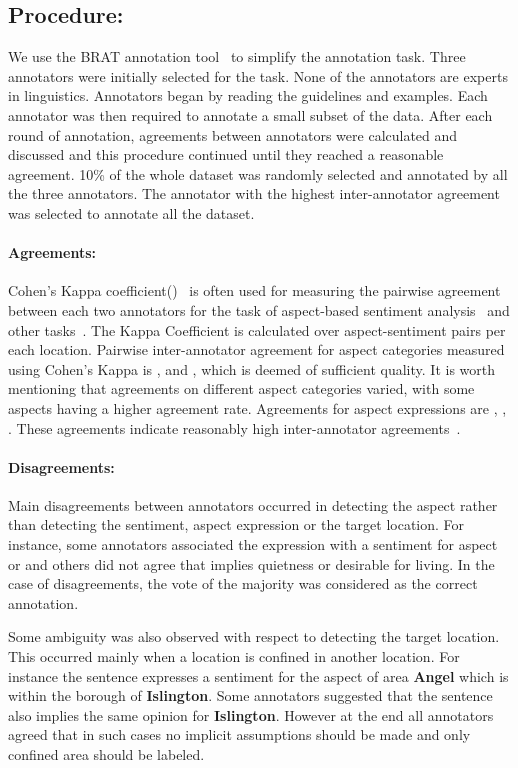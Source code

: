 \documentclass[11pt]{article}
\begin{document}
    \subsection{Procedure:} 
     We use the BRAT annotation tool~\cite{stenetorp2012brat} to simplify the annotation task. Three annotators were initially selected for the task. None of the annotators are experts in linguistics. Annotators began by reading the guidelines and examples. Each annotator was then required to annotate a small subset of the data. After each round of annotation, agreements between annotators were calculated and discussed and this procedure continued until they reached a reasonable agreement.
10\% of the whole dataset was randomly selected and annotated by all the three annotators. The annotator with the highest inter-annotator agreement was selected to annotate all the dataset. \paragraph{Agreements:} 
         Cohen's Kappa coefficient()~\cite{cohen1960} is often used for measuring the pairwise agreement between each two annotators for the task of aspect-based sentiment analysis~\cite{gamon2005pulse,ganu2009beyond} and other tasks~\cite{liakata2010corpora}. The Kappa Coefficient is calculated over aspect-sentiment pairs per each location. Pairwise inter-annotator agreement for aspect categories measured using Cohen's Kappa is ,  and , which is deemed of sufficient quality. It is worth mentioning that agreements on different aspect categories varied, with some aspects having a higher agreement rate.
Agreements for aspect expressions are , , . These agreements indicate reasonably high inter-annotator agreements~\cite{pavlopoulos2014aspect}.
         
         \paragraph{Disagreements:}
         Main disagreements between annotators occurred in detecting the aspect rather than detecting the sentiment, aspect expression or the target location. For instance, some annotators associated the expression  with a  sentiment for aspect  or  and others did not agree that  implies quietness or desirable for living. In the case of disagreements, the vote of the majority was considered as the correct annotation.


         Some ambiguity was also observed with respect to detecting the target location. This occurred mainly when a location is confined in another location. For instance the sentence  expresses a  sentiment for the aspect  of area \textbf{Angel} which is within the borough of \textbf{Islington}. Some annotators suggested that the sentence also implies the same opinion for \textbf{Islington}. However at the end all annotators agreed that in such cases no implicit assumptions should be made and only confined area should be labeled.
         
\end{document}
